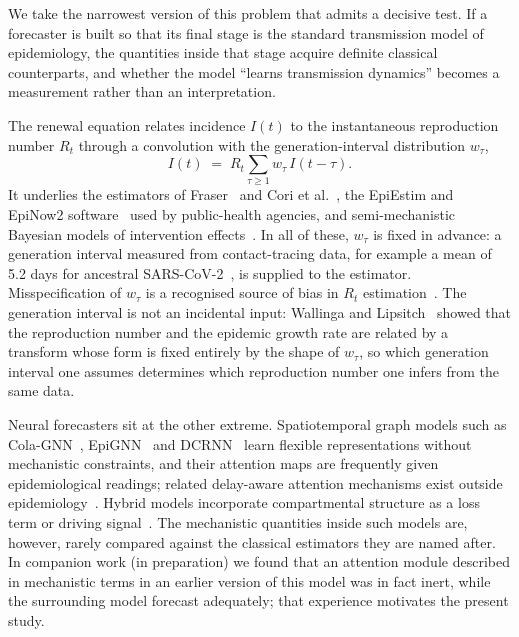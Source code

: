 \documentclass[10pt,letterpaper]{article}
\newcommand{\Rt}{\ensuremath{R_t}\xspace}
\begin{document}
We take the narrowest version of this problem that admits a decisive test. If
a forecaster is built so that its final stage is the standard transmission
model of epidemiology, the quantities inside that stage acquire definite
classical counterparts, and whether the model ``learns transmission dynamics''
becomes a measurement rather than an interpretation.

The renewal equation relates incidence $I(t)$ to the instantaneous
reproduction number \Rt through a convolution with the generation-interval
distribution $w_\tau$,
\begin{equation}
  I(t) \;=\; R_t \sum_{\tau \geq 1} w_\tau\, I(t-\tau).
  \label{eq:renewal}
\end{equation}
It underlies the estimators of Fraser~\cite{fraser2007estimating} and Cori et
al.~\cite{cori2013new}, the EpiEstim and EpiNow2
software~\cite{cori2013new,abbott2020estimating} used by public-health
agencies, and semi-mechanistic Bayesian models of intervention
effects~\cite{flaxman2020estimating}. In all of these, $w_\tau$ is fixed in
advance: a generation interval measured from contact-tracing data, for example
a mean of 5.2 days for ancestral SARS-CoV-2~\cite{ferretti2020quantifying}, is
supplied to the estimator. Misspecification of $w_\tau$ is a recognised
source of bias in \Rt estimation~\cite{gostic2020practical}. The generation
interval is not an incidental input: Wallinga and
Lipsitch~\cite{wallinga2007generation} showed that the reproduction number and
the epidemic growth rate are related by a transform whose form is fixed
entirely by the shape of $w_\tau$, so which generation interval one assumes
determines which reproduction number one infers from the same data.

Neural forecasters sit at the other extreme. Spatiotemporal graph models such
as Cola-GNN~\cite{dengColaGNNCrosslocationAttention2020a},
EpiGNN~\cite{xie2022epignn} and DCRNN~\cite{li2017diffusion} learn flexible
representations without mechanistic constraints, and their attention maps are
frequently given epidemiological readings; related delay-aware attention
mechanisms exist outside epidemiology~\cite{jiang2023pdformer,press2022train,
shaw2018self}. Hybrid models incorporate compartmental structure as a loss
term or driving signal~\cite{gao2021stan,cao2022mepognn}. The mechanistic
quantities inside such models are, however, rarely compared against the
classical estimators they are named after. In companion work (in preparation)
we found that an attention module described in mechanistic terms in an earlier
version of this model was in fact inert, while the surrounding model forecast
adequately; that experience motivates the present study.
\end{document}
